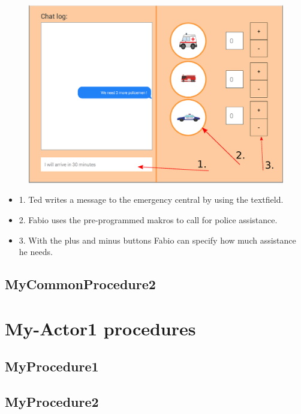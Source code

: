 \begin{minipage}{0.72\textwidth}
\begin{figure}[H]
\includegraphics[width=1.0\textwidth]{Ipad_Messages.eps}
\end{figure}
\end{minipage} \hfill
\begin{minipage}{0.23\textwidth}
\begin{itemize}
\item 1. Ted writes a message to the emergency central by using the textfield.
\item 2. Fabio uses the pre-programmed makros to call for police assistance.
\item 3. With the plus and minus buttons Fabio can specify how much
assistance he needs.
\end{itemize}
\end{minipage}






\subsection{MyCommonProcedure2}


\section{My-Actor1 procedures}

\subsection{MyProcedure1}

\subsection{MyProcedure2}




